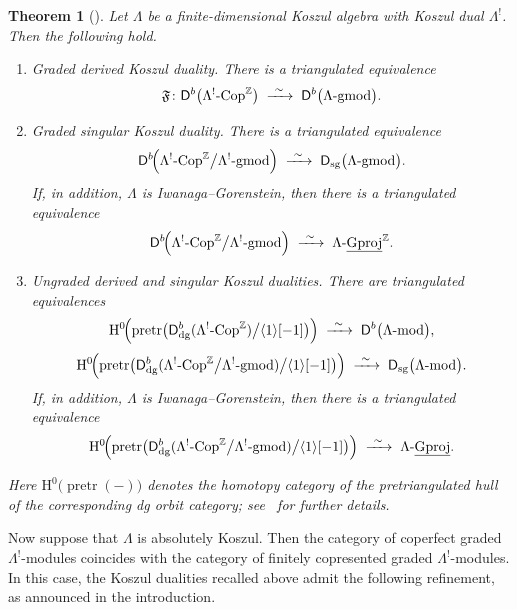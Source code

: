 \documentclass[11pt]{article}
\newtheorem{theorem}{Theorem}[section]
\theoremstyle{definition}
\theoremstyle{remark}
\begin{document}
\begin{theorem}[{\cite[Theorems~3.8, 3.16, 3.17, 4.3, 4.6, 4.8]{4}}]
Let \(\Lambda\) be a finite-dimensional Koszul algebra with Koszul dual \(\Lambda^{!}\). Then the following hold.

\begin{enumerate}\itemsep=0.4em

\item[\textup{(i)}] \emph{Graded derived Koszul duality.}
There is a triangulated equivalence
\[
\mathfrak{F} \colon
\mathsf{D}^{b}\bigl(\Lambda^{!}\textup{-Cop}^{\mathbb{Z}}\bigr)
\;\xrightarrow{\ \sim\ }\;
\mathsf{D}^{b}\bigl(\Lambda\textup{-gmod}\bigr).
\]

\item[\textup{(ii)}] \emph{Graded singular Koszul duality.}
There is a triangulated equivalence
\[
\mathsf{D}^{b}\!\Bigl(\Lambda^{!}\textup{-Cop}^{\mathbb{Z}}\big/\Lambda^{!}\textup{-gmod}\Bigr)
\;\xrightarrow{\ \sim\ }\;
\mathsf{D}_{\mathrm{sg}}\bigl(\Lambda\textup{-gmod}\bigr).
\]
If, in addition, \(\Lambda\) is Iwanaga--Gorenstein, then there is a triangulated equivalence
\[
\mathsf{D}^{b}\!\Bigl(\Lambda^{!}\textup{-Cop}^{\mathbb{Z}}\big/\Lambda^{!}\textup{-gmod}\Bigr)
\;\xrightarrow{\ \sim\ }\;
\Lambda\textup{-}\underline{\mathrm{Gproj}}^{\mathbb{Z}}.
\]

\item[\textup{(iii)}] \emph{Ungraded derived and singular Koszul dualities.}
There are triangulated equivalences
\[
\mathrm{H}^{0}\!\Bigl(
\operatorname{pretr}\bigl(
\mathsf{D}_{\mathrm{dg}}^{b}(\Lambda^{!}\textup{-Cop}^{\mathbb{Z}})
\big/\langle 1 \rangle[-1]
\bigr)
\Bigr)
\;\xrightarrow{\ \sim\ }\;
\mathsf{D}^{b}\bigl(\Lambda\textup{-mod}\bigr),
\]
\[
\mathrm{H}^{0}\!\Bigl(
\operatorname{pretr}\bigl(
\mathsf{D}_{\mathrm{dg}}^{b}(\Lambda^{!}\textup{-Cop}^{\mathbb{Z}}\big/\Lambda^{!}\textup{-gmod})
\big/\langle 1 \rangle[-1]
\bigr)
\Bigr)
\;\xrightarrow{\ \sim\ }\;
\mathsf{D}_{\mathrm{sg}}\bigl(\Lambda\textup{-mod}\bigr).
\]
If, in addition, \(\Lambda\) is Iwanaga--Gorenstein, then there is a triangulated equivalence
\[
\mathrm{H}^{0}\!\Bigl(
\operatorname{pretr}\bigl(
\mathsf{D}_{\mathrm{dg}}^{b}(\Lambda^{!}\textup{-Cop}^{\mathbb{Z}}\big/\Lambda^{!}\textup{-gmod})
\big/\langle 1 \rangle[-1]
\bigr)
\Bigr)
\;\xrightarrow{\ \sim\ }\;
\Lambda\textup{-}\underline{\mathrm{Gproj}}.
\]

\end{enumerate}

Here \(\mathrm{H}^{0}\!\bigl(\operatorname{pretr}(-)\bigr)\) denotes the homotopy category of the pretriangulated hull of the corresponding dg orbit category; see~\cite[Subsection~2.4]{4} for further details.
\end{theorem}
Now suppose that \(\Lambda\) is absolutely Koszul. Then the category of coperfect graded \(\Lambda^{!}\)-modules coincides with the category of finitely copresented graded \(\Lambda^{!}\)-modules. In this case, the Koszul dualities recalled above admit the following refinement, as announced in the introduction.
\end{document}
